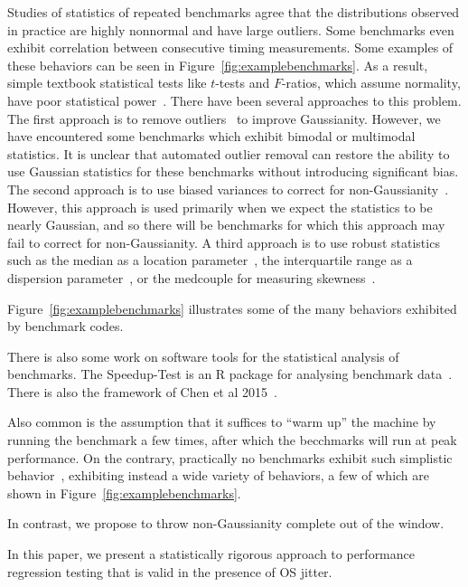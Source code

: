 \documentclass[conference]{IEEEtran}
\begin{document}
Studies of statistics of repeated benchmarks agree that the distributions observed in practice are highly nonnormal and have large outliers. Some benchmarks even exhibit correlation between consecutive
timing measurements.
Some examples of these behaviors can be seen in Figure~\ref{fig:examplebenchmarks}.
As a result, simple textbook statistical tests like $t$-tests and $F$-ratios,
which assume normality, have poor statistical power~\cite{Mytkowicz2009,Kalibera2013,Chen2015,Barrett2016}.
There have been several approaches to this problem.
The first approach is to remove outliers~\cite{Rehn2015} to improve Gaussianity.
However, we have encountered some benchmarks which exhibit bimodal or multimodal
statistics. It is unclear that automated outlier removal can restore the ability
to use Gaussian statistics for these benchmarks without introducing significant bias.
The second approach is to use biased variances to correct for non-Gaussianity~\cite{Mytkowicz2009}.
However, this approach is used primarily when we expect the statistics to be nearly Gaussian,
and so there will be benchmarks for which this approach may fail to correct for
non-Gaussianity.
A third approach is to use robust statistics such as the median as a location parameter~\cite{Mytkowicz2009}, the interquartile range as a dispersion parameter~\cite{Mytkowicz2009}, or the medcouple for measuring skewness~\cite{Rehn2015}.

Figure~\ref{fig:examplebenchmarks} illustrates some of the many behaviors exhibited by benchmark codes.

There is also some work on software tools for the statistical analysis of benchmarks. The Speedup-Test is an R package for analysing benchmark data~\cite{Touati2013}. There is also the framework of Chen et al 2015~\cite{Chen2015}.

Also common is the assumption that it suffices to ``warm up'' the machine by running the benchmark a few times, after which the becchmarks will run at peak performance. On the contrary, practically no benchmarks exhibit such simplistic behavior~\cite{Barrett2016}, exhibiting instead a wide variety of behaviors, a few of which are shown in Figure~\ref{fig:examplebenchmarks}.

In contrast, we propose to throw non-Gaussianity complete out of the window.


In this paper, we present a statistically rigorous approach to performance regression
testing that is valid in the presence of OS jitter.
\end{document}
